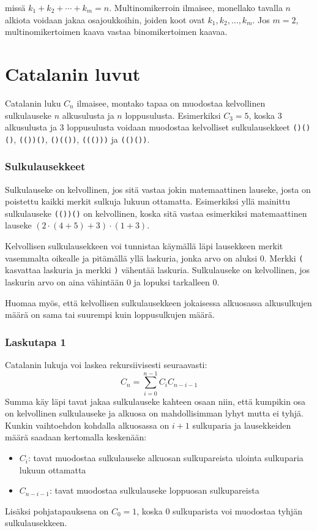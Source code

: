 missä $k_1+k_2+\cdots+k_m=n$.
Multinomikerroin ilmaisee, monellako tavalla $n$ alkiota voidaan jakaa osajoukkoihin,
joiden koot ovat $k_1,k_2,\ldots,k_m$.
Jos $m=2$, multinomikertoimen kaava vastaa binomikertoimen kaavaa.

\section{Catalanin luvut}

Catalanin luku $C_n$ ilmaisee,
montako tapaa on muodostaa kelvollinen sulkulauseke
$n$ alkusulusta ja $n$ loppusulusta.
Esimerkiksi $C_3=5$, koska 3 alkusulusta
ja 3 loppusulusta voidaan muodostaa
kelvolliset sulkulausekkeet
\texttt{()()()}, \texttt{(())()},
\texttt{()(())}, \texttt{((()))} ja \texttt{(()())}.

\subsubsection{Sulkulausekkeet}

Sulkulauseke on kelvollinen,
jos sitä vastaa jokin
matemaattinen lauseke,
josta on poistettu
kaikki merkit sulkuja lukuun ottamatta.
Esimerkiksi yllä mainittu sulkulauseke \texttt{(())()}
on kelvollinen, koska sitä vastaa
esimerkiksi matemaattinen lauseke $(2 \cdot (4+5)+3)\cdot(1+3)$.

Kelvollisen sulkulausekkeen voi tunnistaa käymällä
läpi lausekkeen merkit vasemmalta oikealle ja
pitämällä yllä laskuria, jonka arvo on aluksi 0.
Merkki \texttt{(} kasvattaa laskuria ja
merkki \texttt{)} vähentää laskuria.
Sulkulauseke on kelvollinen, jos laskurin arvo
on aina vähintään 0 ja lopuksi tarkalleen 0.

Huomaa myös, että kelvollisen sulkulausekkeen
jokaisessa alkuosassa alkusulkujen määrä on
sama tai suurempi kuin loppusulkujen määrä.

\subsubsection{Laskutapa 1}

Catalanin lukuja voi laskea rekursiivisesti seuraavasti:
\[ C_n = \sum_{i=0}^{n-1} C_{i} C_{n-i-1}\]
Summa käy läpi tavat
jakaa sulkulauseke kahteen osaan niin,
että kumpikin osa on kelvollinen sulkulauseke
ja alkuosa on mahdollisimman lyhyt mutta ei tyhjä.
Kunkin vaihtoehdon kohdalla alkuosassa
on $i+1$ sulkuparia ja lausekkeiden määrä
saadaan kertomalla keskenään:

\begin{itemize}
\item $C_{i}$: tavat muodostaa sulkulauseke
alkuosan sulkupareista ulointa sulkuparia lukuun ottamatta
\item $C_{n-i-1}$: tavat muodostaa sulkulauseke
loppuosan sulkupareista
\end{itemize}
Lisäksi pohjatapauksena on $C_0=1$, koska 0
sulkuparista voi muodostaa
tyhjän sulkulausekkeen.

